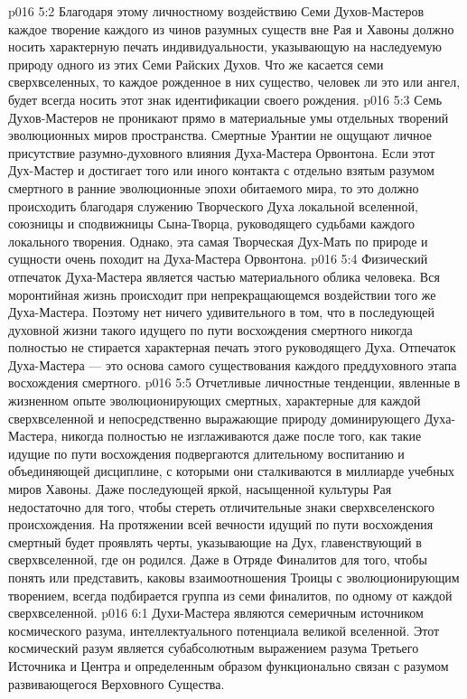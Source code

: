 \vs p016 5:2 Благодаря этому личностному воздействию Семи Духов\hyp{}Мастеров каждое творение каждого из чинов разумных существ вне Рая и Хавоны должно носить характерную печать индивидуальности, указывающую на наследуемую природу одного из этих Семи Райских Духов. Что же касается семи сверхвселенных, то каждое рожденное в них существо, человек ли это или ангел, будет всегда носить этот знак идентификации своего рождения.
\vs p016 5:3 Семь Духов\hyp{}Мастеров не проникают прямо в материальные умы отдельных творений эволюционных миров пространства. Смертные Урантии не ощущают личное присутствие разумно\hyp{}духовного влияния Духа\hyp{}Мастера Орвонтона. Если этот Дух\hyp{}Мастер и достигает того или иного контакта с отдельно взятым разумом смертного в ранние эволюционные эпохи обитаемого мира, то это должно происходить благодаря служению Творческого Духа локальной вселенной, союзницы и сподвижницы Сына\hyp{}Творца, руководящего судьбами каждого локального творения. Однако, эта самая Творческая Дух\hyp{}Мать по природе и сущности очень походит на Духа\hyp{}Мастера Орвонтона.
\vs p016 5:4 Физический отпечаток Духа\hyp{}Мастера является частью материального облика человека. Вся моронтийная жизнь происходит при непрекращающемся воздействии того же Духа\hyp{}Мастера. Поэтому нет ничего удивительного в том, что в последующей духовной жизни такого идущего по пути восхождения смертного никогда полностью не стирается характерная печать этого руководящего Духа. Отпечаток Духа\hyp{}Мастера --- это основа самого существования каждого преддуховного этапа восхождения смертного.
\vs p016 5:5 Отчетливые личностные тенденции, явленные в жизненном опыте эволюционирующих смертных, характерные для каждой сверхвселенной и непосредственно выражающие природу доминирующего Духа\hyp{}Мастера, никогда полностью не изглаживаются даже после того, как такие идущие по пути восхождения подвергаются длительному воспитанию и объединяющей дисциплине, с которыми они сталкиваются в миллиарде учебных миров Хавоны. Даже последующей яркой, насыщенной культуры Рая недостаточно для того, чтобы стереть отличительные знаки сверхвселенского происхождения. На протяжении всей вечности идущий по пути восхождения смертный будет проявлять черты, указывающие на Дух, главенствующий в сверхвселенной, где он родился. Даже в Отряде Финалитов для того, чтобы понять или представить, каковы  взаимоотношения Троицы с эволюционирующим творением, всегда подбирается группа из семи финалитов, по одному от каждой сверхвселенной.
\vs p016 6:1 Духи\hyp{}Мастера являются семеричным источником космического разума, интеллектуального потенциала великой вселенной. Этот космический разум является субабсолютным выражением разума Третьего Источника и Центра и определенным образом функционально связан с разумом развивающегося Верховного Существа.

